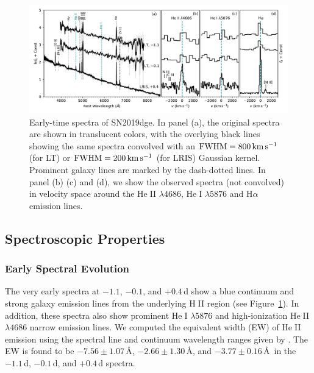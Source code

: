 \documentclass[twocolumn]{aastex63}
\newcommand{\name}{SN2019dge}
\def\ion#1#2{#1$\;${\footnotesize\rm{#2}}\relax}
\begin{document}
\begin{figure}[htbp!]
	\centering
	\includegraphics[width=\textwidth]{figures/spectra_early.pdf}
	\caption{Early-time spectra of \name.  In panel (a), the original spectra are	
		shown in translucent colors, with the overlying black lines showing the same spectra convolved 
		with an ${\rm FWHM} = 800\, {\rm km\, s^{-1}}$ (for LT)  or ${\rm FWHM} = 200\, {\rm km\, 
			s^{-1}}$ (for LRIS) Gaussian kernel. Prominent galaxy lines are marked by the 
		dash-dotted lines. In panel (b) (c) and (d), we show the observed spectra (not convolved) in 
		velocity space around the \ion{He}{II} $\lambda 4686$, \ion{He}{I} $\lambda 5876$ and 
		H$\alpha$ emission lines.
		\label{fig:spectra_early}}
\end{figure}

\subsection{Spectroscopic Properties}\label{subsec:spec_properties}


\subsubsection{Early Spectral Evolution} \label{subsubsec:spec_early}
The very early spectra at $-1.1$, $-0.1$, and $+0.4$\,d show a blue continuum and strong galaxy 
emission lines from the underlying \ion{H}{II} region (see Figure~\ref{fig:spectra_early}). In 
addition, these spectra also show prominent \ion{He}{I} $\lambda5876$ and high-ionization \ion{He}{II} 
$\lambda4686$ narrow emission lines. We computed the equivalent width (EW) of \ion{He}{II} emission 
using the spectral line and continuum wavelength ranges given by \citet{Khazov2016}. The EW is found 
to be $-7.56\pm 1.07$\,\AA, $-2.66\pm 1.30$\,\AA, and $-3.77\pm 0.16$\,\AA\ in the $-1.1$\,d, 
$-0.1$\,d, and $+0.4$\,d spectra. 
\end{document}
